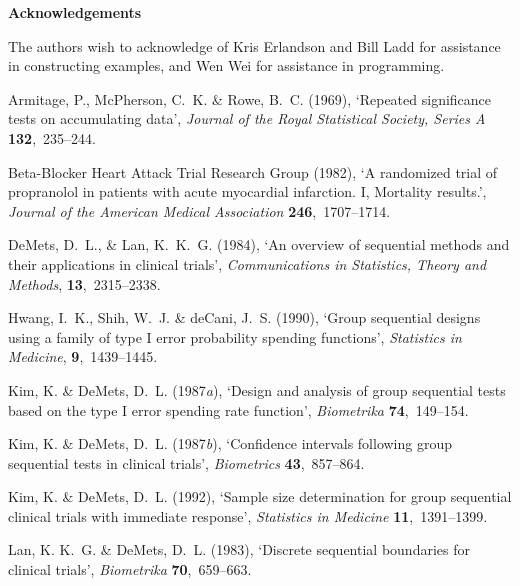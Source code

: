 \begin{center}
  {\bf Acknowledgements}
\end{center}

The authors wish to acknowledge of Kris Erlandson and Bill Ladd for
assistance in constructing examples, and Wen Wei for assistance in
programming.

\begin{thebibliography}{xx}

\item
Armitage, P., McPherson, C.~K. \& Rowe, B.~C.  (1969), `Repeated significance
  tests on accumulating data', {\em Journal of the Royal Statistical Society,
  Series {A}} {\bf 132},~235--244.

\item
{Beta-Blocker Heart Attack Trial Research Group}  (1982), `A randomized trial
  of propranolol in patients with acute myocardial infarction. {I, Mortality
  results.}', {\em Journal of the American Medical Association} {\bf
  246},~1707--1714.

\item
DeMets, D.~L., \& Lan, K.~K.~G. (1984), `An overview of sequential methods
and their applications in clinical trials', {\em Communications in
Statistics, Theory and Methods}, {\bf 13},~2315--2338.

\item
Hwang, I.~K., Shih, W.~J. \& deCani, J.~S. (1990), `Group sequential
designs using a family of type I error probability spending functions',
{\em Statistics in Medicine}, {\bf 9},~1439--1445.

\item
Kim, K. \& DeMets, D.~L.  (1987{\em a}), `Design and analysis of group
  sequential tests based on the type I error spending rate function', {\em
  Biometrika} {\bf 74},~149--154.

\item
Kim, K. \& DeMets, D.~L.  (1987{\em b}), `Confidence intervals following group
  sequential tests in clinical trials', {\em Biometrics} {\bf 43},~857--864.

\item
Kim, K. \& DeMets, D.~L.  (1992), `Sample size determination for group
  sequential clinical trials with immediate response', {\em Statistics in
  Medicine} {\bf 11},~1391--1399.

\item
Lan, K. K.~G. \& DeMets, D.~L.  (1983), `Discrete sequential boundaries for
  clinical trials', {\em Biometrika} {\bf 70},~659--663.


\end{thebibliography}
